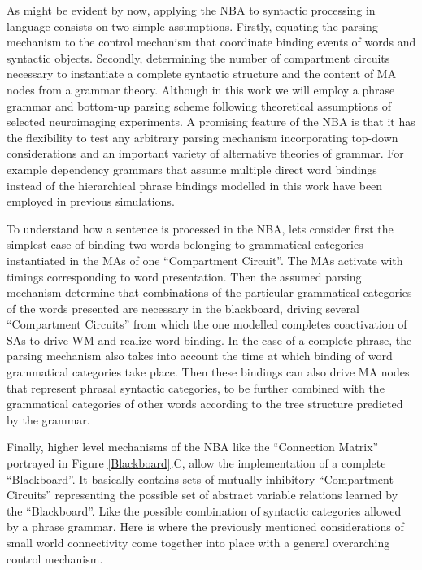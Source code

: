 \documentclass[10pt]{article}
\begin{document}
As might be evident by now, applying the NBA to syntactic processing in language consists on two simple assumptions.
Firstly, equating the parsing mechanism to the control mechanism that coordinate binding events of words and syntactic objects.
Secondly, determining the number of compartment circuits necessary to instantiate a complete syntactic structure and the content of MA nodes from a grammar theory.
Although in this work we will employ a phrase grammar and bottom-up parsing scheme following theoretical assumptions of selected neuroimaging experiments.
A promising feature of the NBA is that it has the flexibility to test any arbitrary parsing mechanism incorporating top-down considerations and an important variety of alternative theories of grammar.
For example dependency grammars that assume multiple direct word bindings instead of the hierarchical phrase bindings modelled in this work have been employed in previous simulations\cite{van_der_Velde_2010}.

To understand how a sentence is processed in the NBA, lets consider first the simplest case of binding two words belonging to grammatical categories instantiated in the MAs of one ``Compartment Circuit''.
The MAs activate with timings corresponding to word presentation.
Then the assumed parsing mechanism determine that combinations of the particular grammatical categories of the words presented are necessary in the blackboard, driving several ``Compartment Circuits'' from which the one modelled completes coactivation of SAs to drive WM and realize word binding.
In the case of a complete phrase, the parsing mechanism also takes into account the time at which binding of word grammatical categories take place.
Then these bindings can also drive MA nodes that represent phrasal syntactic categories, to be further combined with the grammatical categories of other words according to the tree structure predicted by the grammar.

Finally, higher level mechanisms of the NBA like the ``Connection Matrix'' portrayed in Figure {\ref{Blackboard}}.C, allow the implementation of a complete ``Blackboard''.
It basically contains sets of mutually inhibitory ``Compartment Circuits'' representing the possible set of abstract variable relations learned by the ``Blackboard''.
Like the possible combination of syntactic categories allowed by a phrase grammar. Here is where the previously mentioned considerations of small world connectivity come together into place with a general overarching control mechanism.
\end{document}
